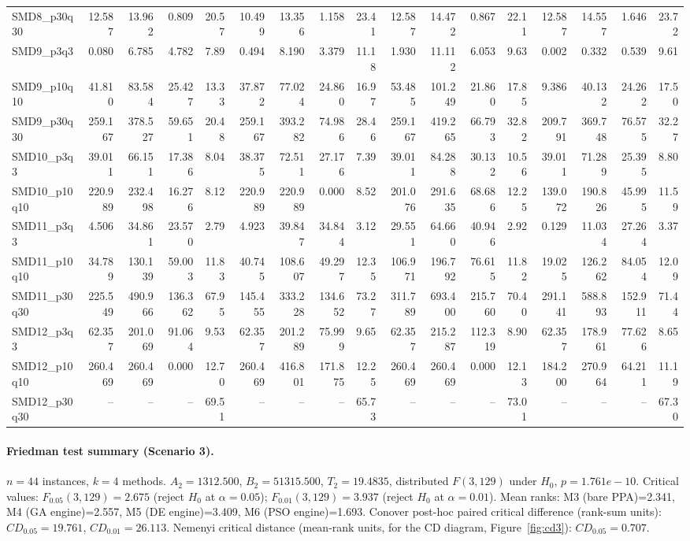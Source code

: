 \begin{longtable}{lrrrrrrrrrrrrrrrr}
SMD8\_p30q30 & 12.587 & 13.962 & 0.809 & 20.57 & 10.499 & 13.356 & 1.158 & 23.41 & 12.587 & 14.472 & 0.867 & 22.11 & 12.587 & 14.557 & 1.646 & 23.72 \\
SMD9\_p3q3 & 0.080 & 6.785 & 4.782 & 7.89 & 0.494 & 8.190 & 3.379 & 11.18 & 1.930 & 11.112 & 6.053 & 9.63 & 0.002 & 0.332 & 0.539 & 9.61 \\
SMD9\_p10q10 & 41.810 & 83.584 & 25.427 & 13.33 & 37.872 & 77.024 & 24.860 & 16.97 & 53.485 & 101.249 & 21.860 & 17.85 & 9.386 & 40.132 & 24.262 & 17.50 \\
SMD9\_p30q30 & 259.167 & 378.527 & 59.651 & 20.48 & 259.167 & 393.282 & 74.986 & 28.46 & 259.167 & 419.265 & 66.793 & 32.82 & 209.791 & 369.748 & 76.575 & 32.27 \\
SMD10\_p3q3 & 39.011 & 66.151 & 17.386 & 8.04 & 38.375 & 72.511 & 27.176 & 7.39 & 39.011 & 84.288 & 30.132 & 10.56 & 39.011 & 71.289 & 25.395 & 8.80 \\
SMD10\_p10q10 & 220.989 & 232.498 & 16.276 & 8.12 & 220.989 & 220.989 & 0.000 & 8.52 & 201.076 & 291.635 & 68.686 & 12.25 & 139.072 & 190.826 & 45.995 & 11.59 \\
SMD11\_p3q3 & 4.506 & 34.861 & 23.570 & 2.79 & 4.923 & 39.847 & 34.844 & 3.12 & 29.551 & 64.660 & 40.946 & 2.92 & 0.129 & 11.034 & 27.264 & 3.37 \\
SMD11\_p10q10 & 34.789 & 130.139 & 59.003 & 11.83 & 40.745 & 108.607 & 49.297 & 12.35 & 106.971 & 196.792 & 76.615 & 11.82 & 19.025 & 126.262 & 84.054 & 12.09 \\
SMD11\_p30q30 & 225.549 & 490.966 & 136.362 & 67.95 & 145.455 & 333.228 & 134.652 & 73.27 & 311.789 & 693.400 & 215.760 & 70.40 & 291.141 & 588.893 & 152.911 & 71.44 \\
SMD12\_p3q3 & 62.357 & 201.069 & 91.064 & 9.53 & 62.357 & 201.289 & 75.999 & 9.65 & 62.357 & 215.287 & 112.319 & 8.90 & 62.357 & 178.961 & 77.626 & 8.65 \\
SMD12\_p10q10 & 260.469 & 260.469 & 0.000 & 12.70 & 260.469 & 416.801 & 171.875 & 12.25 & 260.469 & 260.469 & 0.000 & 12.13 & 184.200 & 270.964 & 64.211 & 11.19 \\
SMD12\_p30q30 & -- & -- & -- & 69.51 & -- & -- & -- & 65.73 & -- & -- & -- & 73.01 & -- & -- & -- & 67.30 \\
\end{longtable}
\endgroup

\paragraph{Friedman test summary (Scenario 3).}
$n=44$ instances, $k=4$ methods. $A_2=1312.500$, $B_2=51315.500$, $T_2=19.4835$, distributed $F(3,129)$ under $H_0$, $p=1.761e-10$. Critical values: $F_{0.05}(3,129)=2.675$ (reject $H_0$ at $\alpha=0.05$); $F_{0.01}(3,129)=3.937$ (reject $H_0$ at $\alpha=0.01$). Mean ranks: M3 (bare PPA)=2.341, M4 (GA engine)=2.557, M5 (DE engine)=3.409, M6 (PSO engine)=1.693. Conover post-hoc paired critical difference (rank-sum units): $CD_{0.05}=19.761$, $CD_{0.01}=26.113$. Nemenyi critical distance (mean-rank units, for the CD diagram, Figure~\ref{fig:cd3}): $CD_{0.05}=0.707$.
